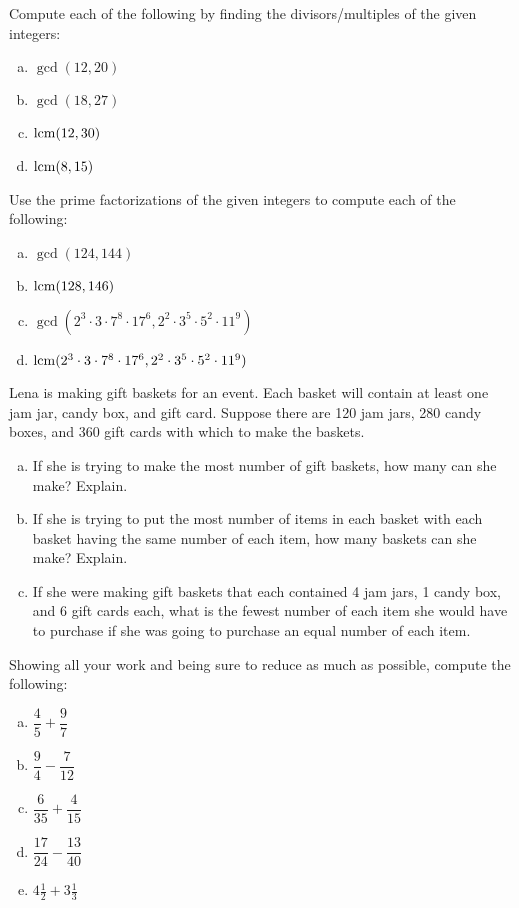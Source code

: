 \documentclass[11pt,letterpaper]{article}
\begin{document}
 Compute each of the following by finding the divisors/multiples of the given integers:
\begin{enumerate}[(a)]
\item $\gcd(12, 20)$
\item $\gcd(18, 27)$
\item $\operatorname{lcm}(12, 30)$
\item $\operatorname{lcm}(8, 15)$
\end{enumerate}



\newpage



 Use the prime factorizations of the given integers to compute each of the following:
\begin{enumerate}[(a)]
\item $\gcd(124, 144)$
\item $\operatorname{lcm}(128, 146)$
\item $\gcd(2^3 \cdot 3 \cdot 7^8 \cdot 17^6, 2^2 \cdot 3^5 \cdot 5^2 \cdot 11^9)$
\item $\operatorname{lcm}(2^3 \cdot 3 \cdot 7^8 \cdot 17^6, 2^2 \cdot 3^5 \cdot 5^2 \cdot 11^9)$
\end{enumerate}



\newpage



 Lena is making gift baskets for an event. Each basket will contain at least one jam jar, candy box, and gift card. Suppose there are 120 jam jars, 280 candy boxes, and 360 gift cards with which to make the baskets. 
\begin{enumerate}[(a)]
\item If she is trying to make the most number of gift baskets, how many can she make? Explain. 
\item If she is trying to put the most number of items in each basket with each basket having the same number of each item, how many baskets can she make? Explain. 
\item If she were making gift baskets that each contained 4 jam jars, 1 candy box, and 6 gift cards each, what is the fewest number of each item she would have to purchase if she was going to purchase an equal number of each item.
\end{enumerate} \pspace



\newpage



 Showing all your work and being sure to reduce as much as possible, compute the following:
\begin{enumerate}[(a)]
\item $\dfrac{4}{5} + \dfrac{9}{7}$
\item $\dfrac{9}{4} - \dfrac{7}{12}$
\item $\dfrac{6}{35} + \dfrac{4}{15}$
\item $\dfrac{17}{24} - \dfrac{13}{40}$
\item $4\frac{1}{2} + 3\frac{1}{3}$
\end{enumerate}
\end{document}
